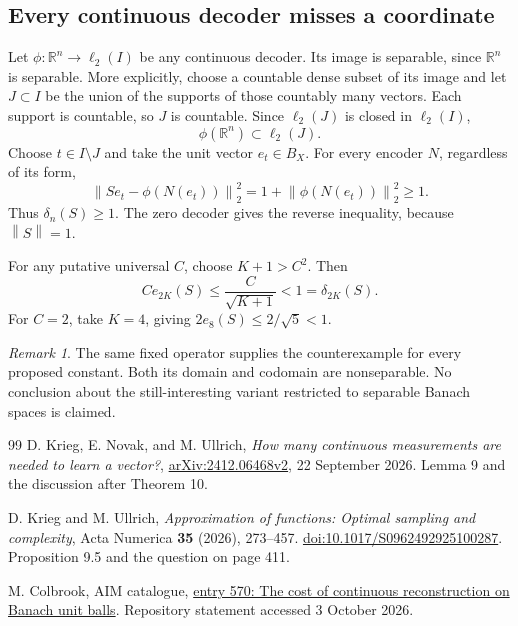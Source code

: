 \documentclass[11pt,a4paper]{article}
\theoremstyle{remark}
\newtheorem{remark}[theorem]{Remark}
\newcommand{\R}{\mathbb R}
\newcommand{\norm}[1]{\left\lVert #1\right\rVert}
\begin{document}
\subsection{Every continuous decoder misses a coordinate}

Let $\phi:\R^n\to\ell_2(I)$ be any continuous decoder. Its image is separable, since $\R^n$ is separable. More explicitly, choose a countable dense subset of its image and let $J\subset I$ be the union of the supports of those countably many vectors. Each support is countable, so $J$ is countable. Since $\ell_2(J)$ is closed in $\ell_2(I)$,
\[
 \phi(\R^n)\subset\ell_2(J).
\]
Choose $t\in I\setminus J$ and take the unit vector $e_t\in B_X$. For every encoder $N$, regardless of its form,
\[
 \norm{Se_t-\phi(N(e_t))}_2^2
 =1+\norm{\phi(N(e_t))}_2^2\ge1.
\]
Thus $\delta_n(S)\ge1$. The zero decoder gives the reverse inequality, because $\norm S=1$.

For any putative universal $C$, choose $K+1>C^2$. Then
\[
 C e_{2K}(S)\le\frac{C}{\sqrt{K+1}}<1=\delta_{2K}(S).
\]
For $C=2$, take $K=4$, giving $2e_8(S)\le2/\sqrt5<1$.

\begin{remark}
The same fixed operator supplies the counterexample for every proposed constant. Both its domain and codomain are nonseparable. No conclusion about the still-interesting variant restricted to separable Banach spaces is claimed.
\end{remark}


\begin{thebibliography}{99}
D. Krieg, E. Novak, and M. Ullrich, \emph{How many continuous measurements are needed to learn a vector?}, \href{https://arxiv.org/abs/2412.06468v2}{arXiv:2412.06468v2}, 22 September 2026. Lemma 9 and the discussion after Theorem 10.

D. Krieg and M. Ullrich, \emph{Approximation of functions: Optimal sampling and complexity}, Acta Numerica \textbf{35} (2026), 273--457. \href{https://doi.org/10.1017/S0962492925100287}{doi:10.1017/S0962492925100287}. Proposition 9.5 and the question on page 411.


M. Colbrook, AIM catalogue, \href{https://github.com/MColbrook/AIM/blob/59a8f0c2957dd272f56bcf282dfe0c066a15f441/problems/570-continuous-decoder-banach-balls.md}{entry 570: The cost of continuous reconstruction on Banach unit balls}. Repository statement accessed 3 October 2026.


\end{thebibliography}
\end{document}
